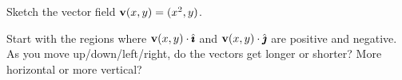 \begin{question}
Sketch the vector field 
$\mathbf{v}(x,y)=(x^2,y)$.
\end{question}

\begin{hint} 
Start with the regions where $\mathbf{v}(x,y)\cdot\hat{\pmb{\imath}}$ and $\mathbf{v}(x,y)\cdot\hat{\pmb{\jmath}}$ are positive and negative. As you move up/down/left/right, do the vectors get longer or shorter? More horizontal or more vertical?
\end{hint}

\begin{answer} 

\begin{center}
\end{center}
\end{answer}

